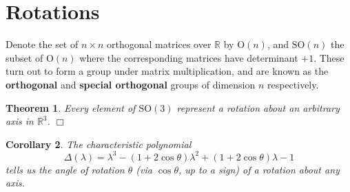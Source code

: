 \documentclass[letter-paper]{tufte-book}
\newtheorem{theorem}{\color{pastel-blue}Theorem}[section]
\newtheorem{corollary}[theorem]{\color{pastel-blue}Corollary}
\newcommand{\qedwhite}{\hfill \ensuremath{\Box}}
\begin{document}

\section{Rotations}

Denote the set of $n\times n$ orthogonal matrices over $\mathbb{R}$ by $\mbox{O}(n)$, and $\mbox{SO}(n)$ the subset of $\mbox{O}(n)$ where the corresponding matrices have determinant $+1$. These turn out to form a group under matrix multiplication, and are known as the \textbf{orthogonal} and \textbf{special orthogonal} groups of dimension $n$ respectively.

\begin{theorem}
  Every element of $\mbox{SO}(3)$ represent a rotation about an arbitrary axis
  in $\mathbb{R}^3$. \qedwhite
\end{theorem}

\begin{corollary}
  The characteristic polynomial
  \begin{equation*}
    \Delta(\lambda) = \lambda^3 - (1+2\cos\theta)\lambda^2 + (1+2\cos\theta)\lambda - 1
  \end{equation*}
  tells us the angle of rotation $\theta$ (via $\cos\theta$, up to a sign) of a
  rotation about any axis.
\end{corollary}
\end{document}
